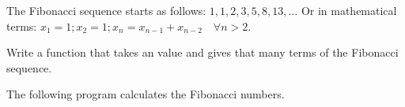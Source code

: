 \begin{Exercise}[title={Fibonacci},difficulty=5]
\label{ex:fibonaci}
\Question\label{ex:fibonaci q1}
The Fibonacci sequence starts as follows: $1, 1, 2, 3, 5, 8, 13, \ldots$
Or in mathematical terms: $ x_1 = 1; x_2 = 1; x_n = x_{n-1} +
x_{n-2}\quad\forall n > 2 $.

Write a function that takes an  value and gives 
that many terms of the Fibonacci sequence.

\end{Exercise}

\begin{Answer}
\Question
The following program calculates the Fibonacci numbers.


\showremarks
\end{Answer}
